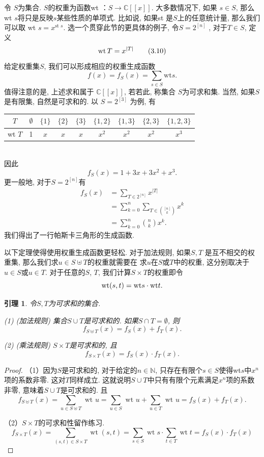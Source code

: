 \documentclass[a4paper,12pt]{ctexbook}
\newtheorem{lemma}{\hspace{2em}引理}[section]%
\begin{document}
令 $S$为集合. $S$的权重为函数wt ：$S \rightarrow \mathbb{C}[[x]]$. 大多数情况下, 如果 $s \in S$, 那么wt $s$将只是反映$s$某些性质的单项式. 比如说, 如果st 是$S$上的任意统计量, 那么我们可以取 wt $s=x^{\text {st } s}$. 选一个贯穿此节的更具体的例子, 令$S=2^{[n]}$ , 对于$T \in S$, 定义
\[
{\rm wt}\, T=x^{|T|} \tag{3.10}
\]
给定权重集$S$, 我们可以形成相应的权重生成函数
$$
f(x)=f_{S}(x)=\sum_{s \in S} \mathrm{wt} s.
$$值得注意的是, 上述求和属于 $\mathbb{C}[[x]]$, 若若此, 称集合 $S$为{\kaishu 可求和集}. 当然, 如果$S$ 是有限集, 自然是可求和的. 以 $S=2^{[3]}$ 为例, 有
\begin{table}[h]
	\centering
	\begin{tabular}{c||c|c|c|c|c|c|c|c}
		$T$ & $\emptyset$ & $\{1\}$ & $\{2\}$ & $\{3\}$ & $\{1,2\}$ & $\{1,3\}$ & $\{2,3\}$ & $\{1,2,3\}$ \\
		\hline wt $T$ & 1 & $x$ & $x$ & $x$ & $x^{2}$ & $x^{2}$ & $x^{2}$ & $x^{3}$
	\end{tabular}
\end{table}
\\
因此
$$
f_{S}(x)=1+3 x+3 x^{2}+x^{3}.
$$
更一般地, 对于$S=2^{[n]}$有
$$
\begin{aligned}
f_{S}(x) &=\sum_{T \in 2^{[n]}} x^{|T|} \\
&=\sum_{k=0}^{n} \sum_{T \in\binom{[n]}{k}} x^{k} \\
&=\sum_{k=0}^{n}\binom{n}{k} x^{k}.
\end{aligned}
$$我们得出了一行帕斯卡三角形的生成函数.

以下定理使得使用权重生成函数更轻松. 对于加法规则, 如果$S, T$ 是互不相交的权重集, 那么我们求$u \in S \uplus T$的权重就需要在 求$u$在$S$或$T$中的权重, 这分别取决于$u \in S $或$u \in  T$. 对于任意的$S$, $T$, 我们计算$S\times T$的权重即令\[{\rm wt}(s,t)={\rm wt}s\cdot{\rm wt}t.\]

\begin{lemma}
	令$S,T$为可求和的集合.

	(1) (加法规则) 集合$S\cup T$是可求和的. 如果$S\cap T=\emptyset$, 则\[
	f_{S\uplus T}(x)=f_{S}(x)+f_{T}(x).
	\]

	(2) (乘法规则) $S\times T$是可求和的, 且\[
	f_{S\times T}(x)=f_{S}(x)\cdot f_{T}(x).
	\]
\end{lemma}
\begin{proof}
	（1）因为$S$是可求和的, 对于给定的$n\in \mathbb{N}$, 只存在有限个$s\in S$使得wt$s$中$x^{n}$项的系数非零. 这对$T$同样成立. 这就说明$S\cup T$中只有有限个元素满足$x^{n}$项的系数非零, 意味着$S\cup T$是可求和的. 且$$f_{S \uplus T}(x)=\sum_{u \in S \uplus T} \text { wt } u=\sum_{u \in S} \text { wt } u+\sum_{u \in T} \text { wt } u=f_{S}(x)+f_{T}(x) .$$

	（2）$S\times T$的可求和性留作练习. $$
	f_{S \times T}(x)=\sum_{(s, t) \in S \times T} \operatorname{wt}(s, t)=\sum_{s \in S} \operatorname{wt} s \cdot \sum_{t \in T} \operatorname{wt} t=f_{S}(x) \cdot f_{T}(x)
	$$
\end{proof}
\end{document}

